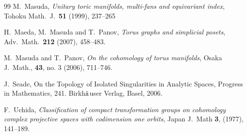 \documentclass[12pt]{amsart}
\theoremstyle{remark}
\numberwithin{equation}{section}
\begin{document}
\begin{thebibliography}{99}
M.~Masuda, 
\emph{Unitary toric manifolds, multi-fans and equivariant index}, 
Tohoku Math.~J.~\textbf{51} (1999), 237--265

H.~Maeda, M.~Masuda and T.~Panov, 
\emph{Torus graphs and simplicial posets},
Adv.\ Math.\ \textbf{212} (2007), 458--483.

M.~Masuda and T.~Panov, 
\emph{On the cohomology of torus manifolds}, 
Osaka J.~Math., \textbf{43}, no. 3 (2006), 711--746.

J.~Seade, 
On the Topology of Isolated Singularities in Analytic Spaces, 
Progress in Mathematics, 241. Birkh${\rm \ddot{a}}$user Verlag, Basel, 2006.

F.~Uchida,
\emph{Classification of compact transformation groups on cohomology complex projective spaces with codimension one orbits},
Japan J.~Math \textbf{3}, (1977), 141--189.

\end{thebibliography}
\end{document}
